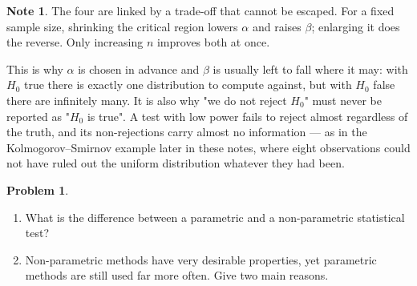 \documentclass[11pt,a4paper]{article}
\theoremstyle{definition}
\newtheorem{note}[thm]{Note}
\newtheorem{problemx}{Problem}[section]
\newenvironment{problem}{\begin{problemx}}{\end{problemx}}
\begin{document}
\begin{note}
The four are linked by a trade-off that cannot be escaped. For a fixed sample
size, shrinking the critical region lowers $\alpha$ and raises $\beta$; enlarging
it does the reverse. Only increasing $n$ improves both at once.

This is why $\alpha$ is chosen in advance and $\beta$ is usually left to fall
where it may: with $H_0$ true there is exactly one distribution to compute
against, but with $H_0$ false there are infinitely many. It is also why "we do not
reject $H_0$" must never be reported as "$H_0$ is true". A test with low power
fails to reject almost regardless of the truth, and its non-rejections carry
almost no information --- as in the Kolmogorov--Smirnov example later in these
notes, where eight observations could not have ruled out the uniform distribution
whatever they had been.
\end{note}

\begin{problem}
\begin{enumerate}
\item[(a).] What is the difference between a parametric and a non-parametric
statistical test?
\item[(b).] Non-parametric methods have very desirable properties, yet parametric
methods are still used far more often. Give two main reasons.
\end{enumerate}
\end{problem}
\end{document}
